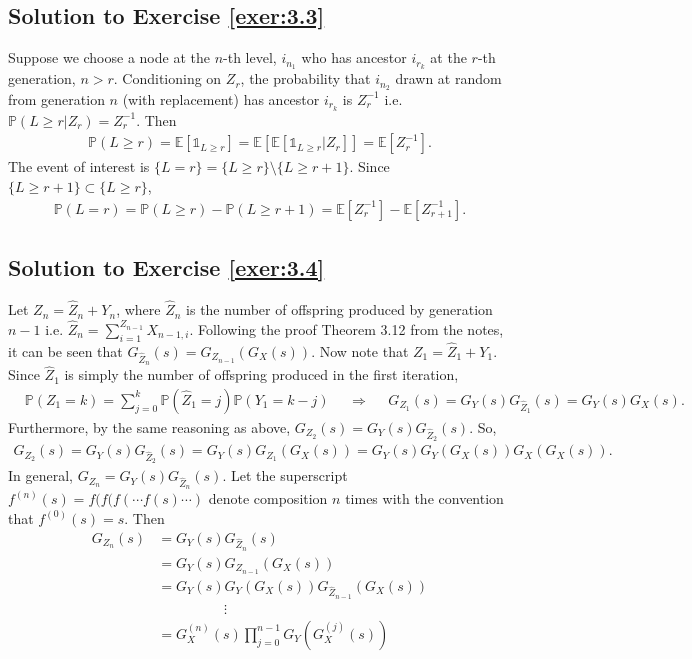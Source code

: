\documentclass[12pt]{book}
\numberwithin{equation}{chapter}
\theoremstyle{plain}
\numberwithin{theorem}{section}
\theoremstyle{definition}
\numberwithin{exercise}{chapter}
\newcommand{\<}{\langle}
\renewcommand{\>}{\rangle}
\renewcommand{\(}{\left(}
\renewcommand{\)}{\right)}
\renewcommand{\[}{\left[}
\renewcommand{\]}{\right]}
\newcommand\Eb{\mathds{E}}
\newcommand\Ib{\mathds{1}} 	%
\newcommand\Pb{\mathds{P}}
\begin{document}
\subsection*{Solution to Exercise \ref{exer:3.3}}
Suppose we choose a node at the $n$-th level, $i_{n_1}$ who has ancestor $i_{r_k}$ at the $r$-th generation, $n > r$. 
Conditioning on $Z_r$, the probability that $i_{n_2}$ drawn at random from generation $n$ (with replacement) has 
ancestor $i_{r_k}$ is $Z_r^{-1}$ i.e. $\Pb( L \geq r | Z_r) = Z_r^{-1}$. Then
\begin{align}
\Pb( L \geq r)
	= \Eb[ \Ib_{L \geq r} ]
	= \Eb[ \Eb[ \Ib_{L \geq r} | Z_r] ]
	= \Eb[ Z_r^{-1}].
\end{align}
The event of interest is $\{ L = r\} = \{ L \geq r \} \setminus \{ L \geq r + 1 \}$. Since $\{ L \geq r+1 \} \subset \{ 
L \geq r \}$, 
\begin{align}
\Pb ( L = r )
	= \Pb( L \geq r ) - \Pb(L \geq r+1) 
	= \Eb[ Z_r^{-1}] - \Eb[ Z_{r+1}^{-1}].
\end{align}

\subsection*{Solution to Exercise \ref{exer:3.4}}
Let $Z_{n} = \widehat Z_n + Y_n$, where $\widehat Z_n$ is the number of offspring produced by generation $n-1$ i.e. $\widehat Z_n = 
\sum_{i=1}^{Z_{n-1}} X_{n-1,i}$. Following the proof Theorem 3.12 from the notes, it can be seen that $G_{\widehat Z_n}(s) 
= G_{Z_{n-1}} ( G_X(s))$. 
Now note that $Z_1 = \widehat Z_1 + Y_1$. Since $\widehat Z_1$ is simply the number of offspring produced in the first 
iteration, 
\begin{align}
&\Pb ( Z_1 = k)
	= \sum_{j=0}^k \Pb( \widehat Z_1 = j) \Pb ( Y_1 = k - j)
&&\Rightarrow
&& G_{Z_1}(s)
	= G_Y(s)G_{\widehat Z_1}(s)
	= G_Y(s)G_X(s).	
\end{align}
Furthermore, by the same reasoning as above, $G_{Z_2}(s) = G_Y(s) G_{\widehat Z_2} (s)$. So, 
\begin{align}
G_{Z_2}(s)
	= G_Y(s) G_{\widehat Z_2}(s)
	= G_Y(s) G_{Z_1} (G_X(s))
	= G_Y(s) G_Y( G_X(s)) G_X ( G_X(s)).
\end{align}
In general, $G_{Z_n} = G_Y(s) G_{\widehat Z_n}(s)$. Let the superscript $f^{(n)}(s) = f(f(f(\cdots f(s) \cdots )$ denote 
composition $n$ times with the convention that $f^{(0)}(s) = s$. Then 
\begin{align}
G_{Z_n}(s)
	&= G_Y(s) G_{\widehat Z_n}(s) \\
	&= G_Y(s) G_{Z_{n-1}}(G_X(s)) \\
	&= G_Y(s) G_Y(G_X(s)) G_{\widehat Z_{n-1}} (G_X(s)) \\
	& \hspace{2cm} \vdots \\
	&= G_X^{(n)}(s) \prod_{j=0}^{n-1} G_Y\( G_X^{(j)}(s) \)
\end{align}
\end{document}
